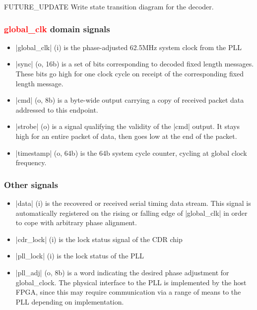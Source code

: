 \documentclass{dune}
\begin{document}
{\color{red}FUTURE\_UPDATE} Write state transition diagram for the decoder.

\subsubsection{\textcolor{red}{global\_clk} domain signals}

\begin{itemize}
	\item |global_clk| (i) is the phase-adjusted 62.5MHz system clock from the PLL
	\item |sync| (o, 16b) is a set of bits corresponding to decoded fixed length messages. These bits go high for one clock cycle on receipt of the corresponding fixed length message.
	\item |cmd| (o, 8b) is a byte-wide output carrying a copy of received packet data addressed to this endpoint.
	\item |strobe| (o) is a signal qualifying the validity of the |cmd| output. It stays high for an entire packet of data, then goes low at the end of the packet.
	\item |timestamp| (o, 64b) is the 64b system cycle counter, cycling at global clock frequency.
\end{itemize}

\subsubsection{Other signals}

\begin{itemize}
	\item |data| (i) is the recovered or received serial timing data stream. This signal is automatically registered on the rising or falling edge of |global_clk| in order to cope with arbitrary phase alignment.
	\item |cdr_lock| (i) is the lock status signal of the CDR chip
	\item |pll_lock| (i) is the lock status of the PLL
	\item |pll_adj| (o, 8b) is a word indicating the desired phase adjustment for global\_clock. The physical interface to the PLL is implemented by the host FPGA, since this may require communication via a range of means to the PLL depending on implementation.
\end{itemize}
\end{document}
